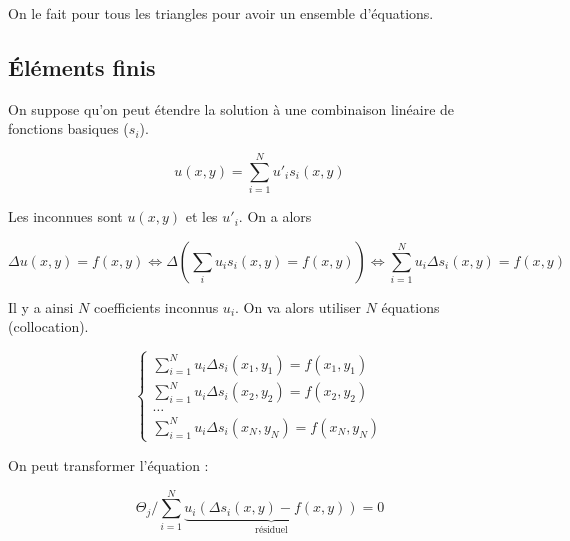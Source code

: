 	On le fait pour tous les triangles pour avoir un ensemble d'équations.
	
	
	\subsection{Éléments finis}
	
	On suppose qu'on peut étendre la solution à une combinaison linéaire de fonctions basiques ($s_i$).
	
	$$u(x, y) = \sum_{i = 1}^N u'_i s_i(x, y)$$
	
	Les inconnues sont $u(x, y)$ et les $u'_i$. On a alors
	
	$$\Delta u(x, y) = f(x, y) \Leftrightarrow \Delta (\sum_i u_i s_i(x, y) = f(x, y)) \Leftrightarrow \sum_{i = 1}^N u_i \Delta s_i(x, y) = f(x, y)$$
	
	Il y a ainsi $N$ coefficients inconnus $u_i$. On va alors utiliser $N$ équations (collocation).
	
	$$\left\{
	\begin{array}{l}
	\sum_{i = 1}^N u_i \Delta s_i(x_1, y_1) = f(x_1, y_1) \\
	\sum_{i = 1}^N u_i \Delta s_i(x_2, y_2) = f(x_2, y_2) \\
	\dots \\
	\sum_{i = 1}^N u_i \Delta s_i(x_N, y_N) = f(x_N, y_N)
\end{array}
\right.$$

	On peut transformer l'équation :
	
	$$\Theta_j / \sum_{i = 1}^N \underbrace{u_i (\Delta s_i(x, y) - f(x, y))}_{\text{résiduel}} = 0$$
	
	